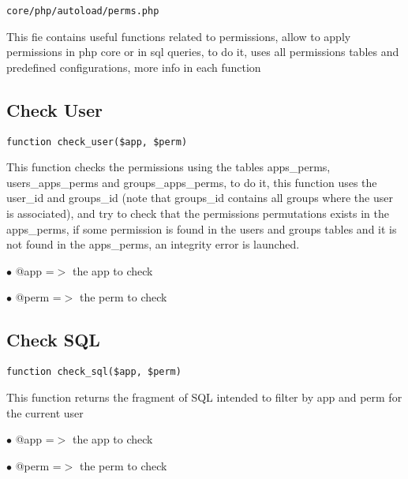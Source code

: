\documentclass[a4paper]{book}
\begin{document}
\begin{lstlisting}
core/php/autoload/perms.php
\end{lstlisting}

This fie contains useful functions related to permissions, allow to apply permissions in php core
or in sql queries, to do it, uses all permissions tables and predefined configurations, more info
in each function

\hypertarget{toc204}{}
\subsection{Check User}

\begin{lstlisting}
function check_user($app, $perm)
\end{lstlisting}

This function checks the permissions using the tables apps\_perms,
users\_apps\_perms and groups\_apps\_perms, to do it, this function uses
the user\_id and groups\_id (note that groups\_id contains all groups
where the user is associated), and try to check that the permissions
permutations exists in the apps\_perms, if some permission is found
in the users and groups tables and it is not found in the apps\_perms,
an integrity error is launched.

\begin{compactitem}
\item[\color{myblue}$\bullet$] @app  =$>$ the app to check
\item[\color{myblue}$\bullet$] @perm =$>$ the perm to check
\end{compactitem}

\hypertarget{toc205}{}
\subsection{Check SQL}

\begin{lstlisting}
function check_sql($app, $perm)
\end{lstlisting}

This function returns the fragment of SQL intended to filter by app and
perm for the current user

\begin{compactitem}
\item[\color{myblue}$\bullet$] @app  =$>$ the app to check
\item[\color{myblue}$\bullet$] @perm =$>$ the perm to check
\end{compactitem}
\end{document}
